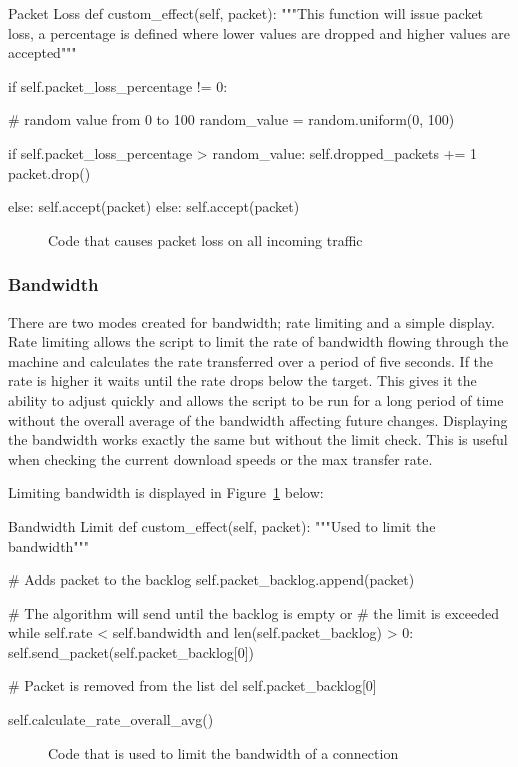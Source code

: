 \begin{Code}{Packet Loss}
def custom_effect(self, packet):
        """This function will issue packet loss,
           a percentage is defined where lower 
           values are dropped and higher values are accepted"""

        if self.packet_loss_percentage != 0:

            # random value from 0 to 100
            random_value = random.uniform(0, 100)

            if self.packet_loss_percentage > random_value:
                self.dropped_packets += 1
                packet.drop()

            else:
                self.accept(packet)
        else:
            self.accept(packet)
\end{Code}
\begin{figure}[h]
	\caption{Code that causes packet loss on all incoming traffic}
\end{figure}

\subsubsection{Bandwidth}
There are two modes created for bandwidth; rate limiting and a simple display. Rate limiting allows the script to limit the rate of bandwidth flowing through the machine and calculates the rate transferred over a period of five seconds. If the rate is higher it waits until the rate drops below the target. This gives it the ability to adjust quickly and allows the script to be run for a long period of time without the overall average of the bandwidth affecting future changes. Displaying the bandwidth works exactly the same but without the limit check. This is useful when checking the current download speeds or the max transfer rate.

Limiting bandwidth is displayed in Figure~\ref{ref:BandwidthCode} below:

\begin{Code}{Bandwidth Limit}
def custom_effect(self, packet):
	"""Used to limit the bandwidth"""

	# Adds packet to the backlog
	self.packet_backlog.append(packet)
	
	# The algorithm will send until the backlog is empty or 
	# the limit is exceeded
	while self.rate < self.bandwidth and len(self.packet_backlog) > 0:
		self.send_packet(self.packet_backlog[0])
            
		# Packet is removed from the list
		del self.packet_backlog[0]
			
		self.calculate_rate_overall_avg()
\end{Code}
\begin{figure}[h]
	\caption{Code that is used to limit the bandwidth of a connection}
	\label{ref:BandwidthCode}
\end{figure}

